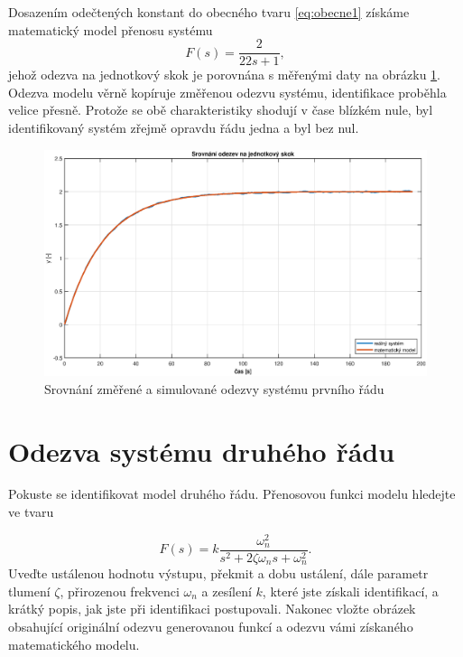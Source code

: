 \documentclass[twoside]{article}
\begin{document}
Dosazením odečtených konstant do obecného tvaru \eqref{eq:obecne1} získáme matematický model přenosu systému 
\begin{equation}
	F(s) = \frac{2}{22s + 1},
\end{equation}
jehož odezva na jednotkový skok je porovnána s měřenými daty na obrázku \ref{fig:zaver1}. Odezva modelu
věrně kopíruje změřenou odezvu systému, identifikace proběhla velice přesně. Protože se obě charakteristiky shodují
v čase blízkém nule, byl identifikovaný systém zřejmě opravdu řádu jedna a byl bez nul.
\begin{figure}
	\centering
	\includegraphics[width=\linewidth]{odezvy1_zaver.eps}
	\caption{Srovnání změřené a simulované odezvy systému prvního řádu}
	\label{fig:zaver1}
\end{figure}

\section{Odezva systému druhého řádu}
Pokuste se identifikovat model druhého řádu. Přenosovou funkci modelu hledejte ve tvaru

\begin{equation}
	F(s) = k \frac{\omega_n^2}{s^2 + 2\zeta \omega_n s + \omega_n^2}.
	\label{eq:obecne2}
\end{equation}
Uveďte ustálenou hodnotu výstupu, překmit a dobu ustálení, dále parametr tlumení $\zeta$,
přirozenou frekvenci $\omega_n$ a zesílení $k$, které jste získali identifikací, a
krátký popis, jak jste při identifikaci postupovali.
Nakonec vložte obrázek obsahující originální odezvu generovanou funkcí a odezvu vámi získaného
matematického modelu.
\end{document}
